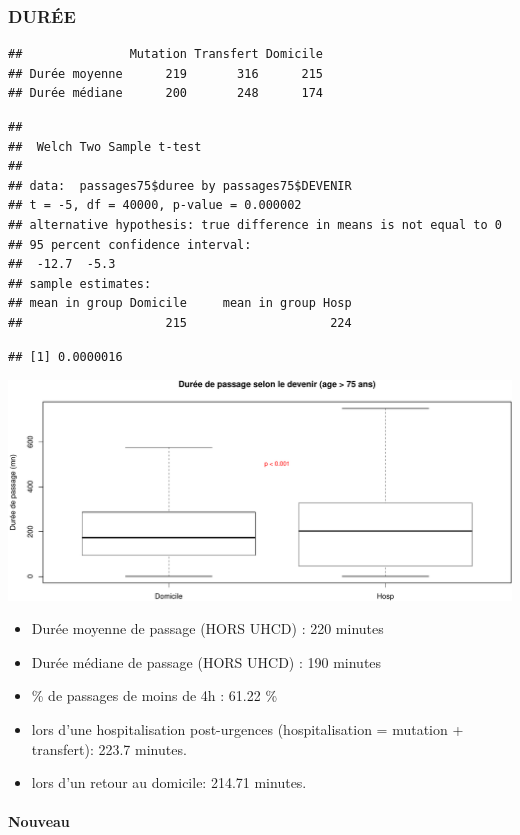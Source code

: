 \documentclass[]{article}
\begin{document}
\subsubsection{DURÉE}\label{duree}

\begin{verbatim}
##               Mutation Transfert Domicile
## Durée moyenne      219       316      215
## Durée médiane      200       248      174
\end{verbatim}

\begin{verbatim}
## 
##  Welch Two Sample t-test
## 
## data:  passages75$duree by passages75$DEVENIR
## t = -5, df = 40000, p-value = 0.000002
## alternative hypothesis: true difference in means is not equal to 0
## 95 percent confidence interval:
##  -12.7  -5.3
## sample estimates:
## mean in group Domicile     mean in group Hosp 
##                    215                    224
\end{verbatim}

\begin{verbatim}
## [1] 0.0000016
\end{verbatim}

\includegraphics{Figs/duree_passage_75-1.pdf}

\begin{itemize}
\itemsep1pt\parskip0pt
\item
  Durée moyenne de passage (HORS UHCD) : 220 minutes
\item
  Durée médiane de passage (HORS UHCD) : 190 minutes
\item
  \% de passages de moins de 4h : 61.22 \%
\item
  lors d'une hospitalisation post-urgences (hospitalisation = mutation +
  transfert): 223.7 minutes.
\item
  lors d'un retour au domicile: 214.71 minutes.
\end{itemize}

\paragraph{Nouveau}\label{nouveau}
\end{document}
